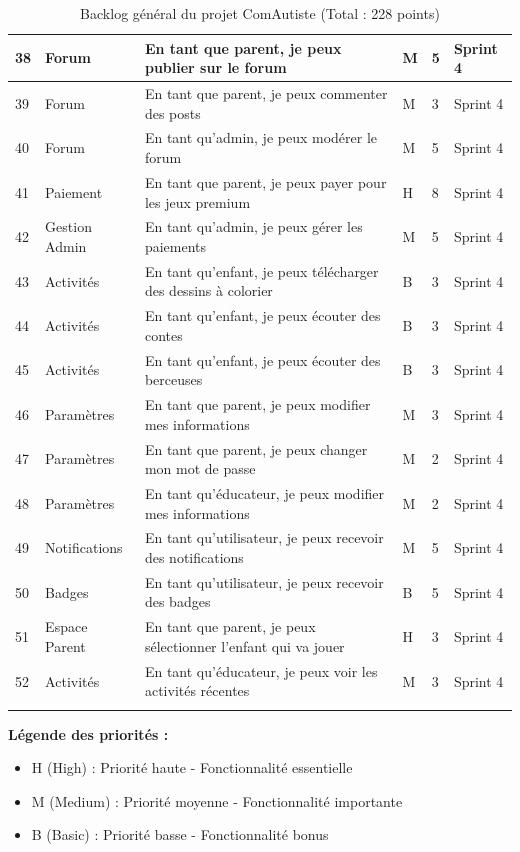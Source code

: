 \documentclass[12pt,a4paper]{report}
\begin{document}
\begin{longtable}{|p{0.5cm}|p{3cm}|p{6cm}|p{1cm}|p{1cm}|p{1.5cm}|}
38 & Forum & En tant que parent, je peux publier sur le forum & M & 5 & Sprint 4 \\
\hline
39 & Forum & En tant que parent, je peux commenter des posts & M & 3 & Sprint 4 \\
\hline
40 & Forum & En tant qu'admin, je peux modérer le forum & M & 5 & Sprint 4 \\
\hline
41 & Paiement & En tant que parent, je peux payer pour les jeux premium & H & 8 & Sprint 4 \\
\hline
42 & Gestion Admin & En tant qu'admin, je peux gérer les paiements & M & 5 & Sprint 4 \\
\hline
43 & Activités & En tant qu'enfant, je peux télécharger des dessins à colorier & B & 3 & Sprint 4 \\
\hline
44 & Activités & En tant qu'enfant, je peux écouter des contes & B & 3 & Sprint 4 \\
\hline
45 & Activités & En tant qu'enfant, je peux écouter des berceuses & B & 3 & Sprint 4 \\
\hline
46 & Paramètres & En tant que parent, je peux modifier mes informations & M & 3 & Sprint 4 \\
\hline
47 & Paramètres & En tant que parent, je peux changer mon mot de passe & M & 2 & Sprint 4 \\
\hline
48 & Paramètres & En tant qu'éducateur, je peux modifier mes informations & M & 2 & Sprint 4 \\
\hline
49 & Notifications & En tant qu'utilisateur, je peux recevoir des notifications & M & 5 & Sprint 4 \\
\hline
50 & Badges & En tant qu'utilisateur, je peux recevoir des badges & B & 5 & Sprint 4 \\
\hline
51 & Espace Parent & En tant que parent, je peux sélectionner l'enfant qui va jouer & H & 3 & Sprint 4 \\
\hline
52 & Activités & En tant qu'éducateur, je peux voir les activités récentes & M & 3 & Sprint 4 \\
\hline

\caption{Backlog général du projet ComAutiste (Total : 228 points)}
\end{longtable}

\textbf{Légende des priorités :}
\begin{itemize}
    \item H (High) : Priorité haute - Fonctionnalité essentielle
    \item M (Medium) : Priorité moyenne - Fonctionnalité importante
    \item B (Basic) : Priorité basse - Fonctionnalité bonus
\end{itemize}
\end{document}
